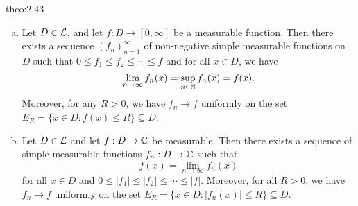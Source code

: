 \begin{theo}{theo:2.43}
    \begin{enumerate}[(a)]
        \item Let $D \in {\cal L}$, and let $f : D \to [0, \infty]$ be a 
        measurable function. Then there exists a sequence $(f_n)_{n=1}^\infty$ 
        of non-negative simple measurable functions on $D$ such that 
        $0 \leq f_1 \leq f_2 \leq \cdots \leq f$ and for all $x \in D$, we have 
        \[ \lim_{n\to\infty} f_n(x) = \sup_{n\in\mathbb{N}} f_n(x) = f(x). \] 
        Moreover, for any $R > 0$, we have $f_n \to f$ uniformly on the 
        set $E_R = \{x \in D : f(x) \leq R\} \subseteq D$. 
        \newpage 
        \item Let $D \in {\cal L}$ and let $f : D \to \mathbb{C}$ be measurable. 
        Then there exists a sequence of simple measurable functions 
        $f_n : D \to \mathbb{C}$ such that 
        \[ f(x) = \lim_{n\to\infty} f_n(x) \] 
        for all $x \in D$ and $0 \leq |f_1| \leq |f_2| \leq \cdots \leq |f|$. 
        Moreover, for all $R > 0$, we have $f_n \to f$ uniformly on the set 
        $E_R = \{x \in D : |f_n(x)| \leq R\} \subseteq D$. 
    \end{enumerate}
\end{theo}
